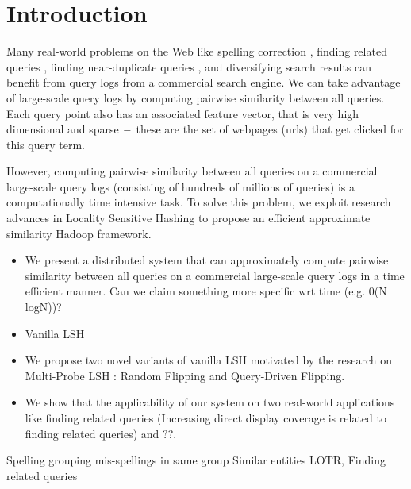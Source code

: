 
 \section{Introduction}
Many real-world problems on the Web like spelling correction \cite{}, 
finding related queries \cite{Jones06WWW,Jain11SIGIR,Song12WSDM}, finding near-duplicate queries \cite{}, 
and diversifying search results \cite{Song11SIGIR} 
can benefit from query logs from a commercial search engine. 
We can take advantage of large-scale query logs 
by computing pairwise similarity between all queries. Each query point also has an associated feature vector, that is
very high dimensional and sparse $\--$ these are the set of webpages (urls) that
get clicked for this query term.

However, computing pairwise similarity between 
all queries on a commercial large-scale query logs (consisting of hundreds of millions of  queries) 
is a computationally time intensive task. 
To solve this problem, we exploit research advances in Locality Sensitive Hashing 
\cite{Indyk98STOC,Charikar02STOC,Andoni06FOCS,Andoni08CACM}  
to propose an efficient approximate similarity Hadoop framework.  


\begin{itemize}
\item We present a distributed system that can approximately compute pairwise similarity 
between all queries on a commercial large-scale query logs in a time efficient manner. 
Can we claim something more specific wrt time (e.g. 0(N logN))?
\item Vanilla LSH 
\item We propose two novel variants of vanilla LSH motivated by the research on Multi-Probe LSH \cite{LvVLDB07}: Random Flipping and Query-Driven Flipping. 
\item  We show that the applicability of our system on two real-world applications like finding related queries (Increasing  direct display coverage is related to finding related queries) and ??.
\end{itemize}


Spelling {grouping mis-spellings in same group}
Similar entities {LOTR,}
Finding related queries
